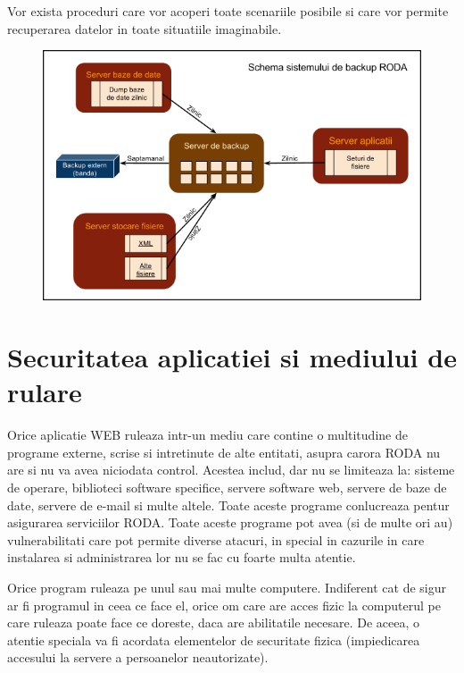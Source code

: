 Vor exista proceduri care vor acoperi toate scenariile posibile si care vor permite recuperarea datelor in toate
situatiile imaginabile.

\begin{figure}[hbt]
\centering
\includegraphics[width=\textwidth]{SecuritateaarhiveiRODA-img001.png}
\label{fig:img001}
\end{figure}

\section{Securitatea aplicatiei si mediului de rulare}

Orice aplicatie WEB ruleaza intr-un mediu care contine o multitudine de programe externe, scrise si intretinute de alte
entitati, asupra carora RODA nu are si nu va avea niciodata control. Acestea includ, dar nu se limiteaza la: sisteme de
operare, biblioteci software specifice, servere software web, servere de baze de date, servere de e-mail si multe
altele. Toate aceste programe conlucreaza pentur asigurarea serviciilor RODA. Toate aceste programe pot avea (si de
multe ori au) vulnerabilitati care pot permite diverse atacuri, in special in cazurile in care instalarea si
administrarea lor nu se fac cu foarte multa atentie.

Orice program ruleaza pe unul sau mai multe computere. Indiferent cat de sigur ar fi programul in ceea ce face el, orice
om care are acces fizic la computerul pe care ruleaza poate face ce doreste, daca are abilitatile necesare. De aceea, o
atentie speciala va fi acordata elementelor de securitate fizica (impiedicarea accesului la servere a persoanelor
neautorizate).

